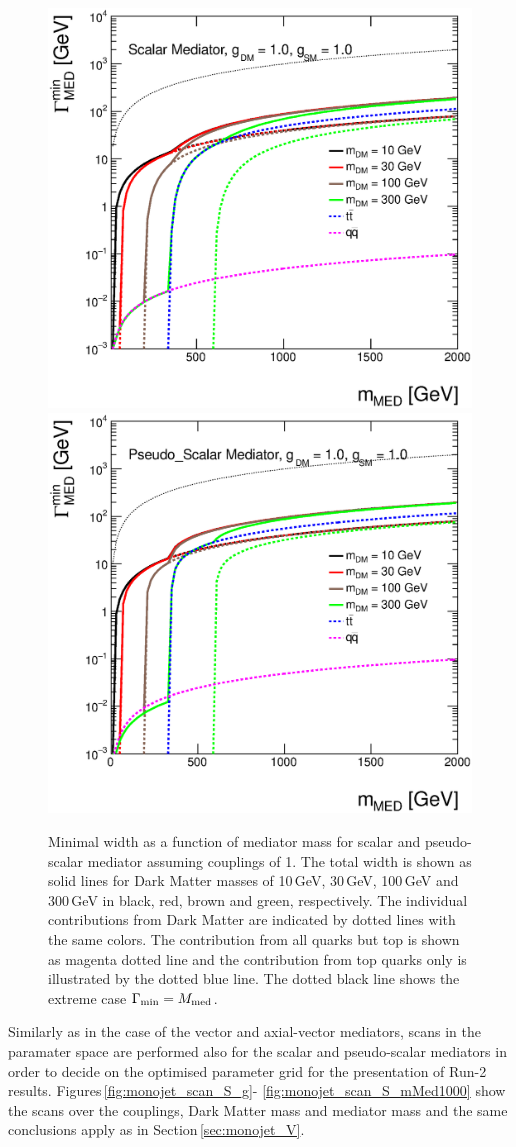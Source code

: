 \begin{figure}
\centering
\includegraphics[width=0.45\linewidth]{figures/monojet/width_S.eps}
\includegraphics[width=0.45\linewidth]{figures/monojet/width_P.eps}
\caption{Minimal width as a function of mediator mass for scalar and pseudo-scalar mediator assuming couplings of 1. The total width is shown as solid lines for Dark Matter masses of 10\,GeV, 30\,GeV, 100\,GeV and 300\,GeV in black, red, brown and green, respectively. The individual contributions from Dark Matter are indicated by dotted lines with the same colors. The contribution from all quarks but top is shown as magenta dotted line and the contribution from top quarks only is illustrated by the dotted blue line. The dotted black line shows the extreme case $\Gamma_{\rm{min}}=M_{\rm{med}}$.}
\label{fig:monojet_width_S}
\end{figure}


Similarly as in the case of the vector and axial-vector mediators, scans in the paramater space are performed also for the scalar and pseudo-scalar mediators in order to decide on the optimised parameter grid for the presentation of Run-2 results. Figures\,\ref{fig:monojet_scan_S_g}-
\ref{fig:monojet_scan_S_mMed1000} show the scans over the couplings, Dark Matter mass and mediator mass and the same conclusions apply as in Section\,\ref{sec:monojet_V}.

